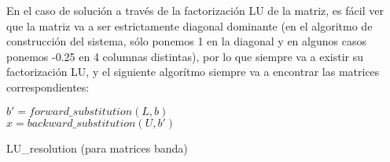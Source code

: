 En el caso de solución a través de la factorización LU de la matriz, es fácil ver que la matriz va a ser estrictamente diagonal dominante (en el algoritmo de construcción del sistema, sólo ponemos 1 en la diagonal y en algunos casos ponemos -0.25 en 4 columnas distintas), por lo que siempre va a existir su factorización LU, y el siguiente algorítmo siempre va a encontrar las matrices correspondientes:

\begin{algorithm}[H]
 \vspace{0.5cm}	
 
 	$b' = forward\_substitution(L,b)$ \\
 	$x = backward\_substitution(U,b')$ \\
   	\vspace{0.5cm}	
\caption{LU\_resolution (para matrices banda) \label{alg_LU_resolution}}  
\end{algorithm} 


